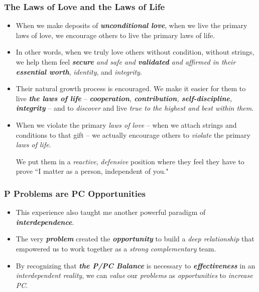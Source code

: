 \documentclass[11pt]{article}
\begin{document}
\subsubsection{The Laws of Love and the Laws of Life}
\begin{itemize}
\item When we make deposits of \emph{\textbf{unconditional love}}, when we live the primary laws of love, we encourage others to live the primary laws of life.

\item In other words, when we truly love others without condition, without strings, we help them feel \emph{\textbf{secure} and safe and \textbf{validated} and affirmed in their \textbf{essential worth}}, \emph{identity}, and \emph{integrity}.

\item Their natural growth process is encouraged. We make it easier for them to live \emph{\textbf{the laws of life}} -- \emph{\textbf{cooperation}, \textbf{contribution}, \textbf{self-discipline}, \textbf{integrity}} -- and to \emph{discover} and live \emph{true to the highest and best within them}.

\item When we violate the primary \emph{laws of love} -- when we attach strings and conditions to that gift -- we actually encourage others to \emph{violate} the primary \emph{laws of life}.

We put them in a \emph{reactive}, \emph{defensive} position where they feel they have to prove ``I matter as a person, independent of you."
\end{itemize}
\subsubsection{P Problems are PC Opportunities}
\begin{itemize}
\item This experience also taught me another powerful paradigm of \emph{\textbf{interdependence}}. 

\item The very \emph{\textbf{problem}} created the \emph{\textbf{opportunity}} to build a \emph{deep relationship} that empowered us to work together as a \emph{strong} \emph{complementary} team.

\item By recognizing that \emph{\textbf{the P/PC Balance}} is necessary to \emph{\textbf{effectiveness}} in an \emph{interdependent reality}, we can \emph{value} our \emph{problems} as \emph{opportunities} to \emph{increase PC}.
\end{itemize}
\end{document}
